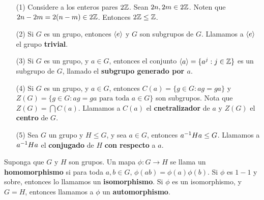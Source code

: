 \begin{example}\label{}
    \begin{enumerate}
        \item[(1)] Considere a los enteros pares $2\mathbb{Z}$. Sean  $2n,2m \in 2\mathbb{Z}$.
            Noten que $2n-2m=2(n-m) \in 2\mathbb{Z}$. Entonces $2\mathbb{Z} \leq \mathbb{Z}$.

        \item[(2)] Si $G$ es un grupo, entonces  $\langle e\rangle$ y $G$ son
            subgrupos de  $G$. Llamamos a $\langle e\rangle$ el grupo
            \textbf{trivial}.

        \item[(3)] Si $G$ es un grupo, y  $a \in G$, entonces el conjunto
            $\langle a\rangle=\{a^j : j \in \mathbb{Z}\}$ es un subgrupo de $G$, llamado el
            \textbf{subgrupo generado por $a$}.

        \item[(4)] Si $G$ es un grupo, y  $a \in G$, entonces  $C(a)=\{g \in G :
            ag=ga\}$ y $Z(G)=\{g \in G : ag=ga \text{ para toda } a \in G\}$ son
            subgrupos. Nota que $Z(G)=\bigcap{C(a)}$. Llamamos a $C(a)$ el
            \textbf{cnetralizador} de $a$ y  $Z(G)$ el \textbf{centro} de $G$.

        \item[(5)] Sea $G$ un grupo y  $H \leq G$, y sea  $a \in G$, entonces
        $a^{-1}Ha \leq G$. Llamamos a $a^{-1}Ha$ el \textbf{conjugado} de $H$
         \textbf{con respecto} a $a$.
    \end{enumerate}
\end{example}

\begin{definition}
    Suponga que $G$ y  $H$ son grupos. Un mapa  $\phi:G \rightarrow H$ se llama
    un \textbf{homomorphismo} si para toda $a,b \in G$,
    $\phi(ab)=\phi(a)\phi(b)$. Si $\phi$ es  $1-1$ y sobre, entonces lo llamamos
    un  \textbf{isomorphismo}. Si $\phi$ es un isomorphismo, y  $G=H$, entonces
    llamamos a  $\phi$ un  \textbf{automorphismo}.
\end{definition}

